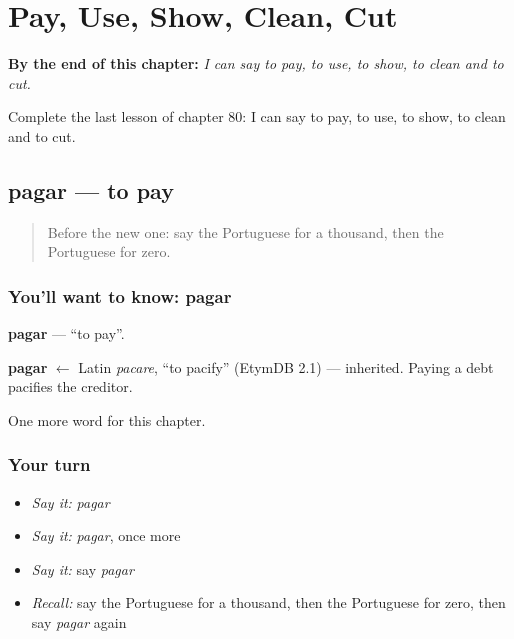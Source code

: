 
\chapter{Pay, Use, Show, Clean, Cut}
\label{ch:pt-pay-use-show-clean-cut}

\begin{chapteropening}
\textbf{By the end of this chapter:} \emph{I can say to pay, to use, to show, to clean and to cut.}

Complete the last lesson of chapter 80: I can say to pay, to use, to show, to clean and to cut.
\end{chapteropening}

\section[pagar]{pagar — to pay}

\label{lesson:PT-C80-pagar}



\begin{quote}
Before the new one: say the Portuguese for a thousand, then the Portuguese for zero.
\end{quote}

\subsection*{You'll want to know: pagar}
\textbf{pagar} — \textquotedblleft{}to pay\textquotedblright{}.

\begin{cousinweb}
\textbf{pagar} $\leftarrow$ Latin \emph{pacare}, \textquotedblleft{}to pacify\textquotedblright{} (EtymDB 2.1) — inherited. Paying a debt pacifies the creditor.
\end{cousinweb}

\begin{grammarlens}[title={What you've built}]
One more word for this chapter.
\end{grammarlens}

\subsection*{Your turn}
\begin{itemize}
\raggedright
  \item \emph{Say it:} \emph{pagar}
  \item \emph{Say it:} \emph{pagar}, once more
  \item \emph{Say it:} say \emph{pagar}
  \item \emph{Recall:} say the Portuguese for a thousand, then the Portuguese for zero, then say \emph{pagar} again
\end{itemize}

